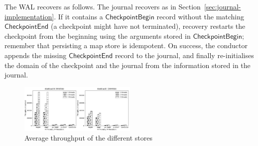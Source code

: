 
The WAL recovers as follows.
The journal recovers as in Section~\ref{sec:journal-implementation}.
If it contains a \ensuremath{\mathsf{CheckpointBegin}} record without
the matching \ensuremath{\mathsf{CheckpointEnd}} (a checkpoint might have not terminated), recovery restarts the checkpoint from the beginning using
the arguments stored in \ensuremath{\mathsf{CheckpointBegin}}; remember
that persisting a map store is idempotent.
On success, the conductor appends the missing
\ensuremath{\mathsf{CheckpointEnd}} record to the journal, and finally
re-initialises the domain of the checkpoint and the journal from the
information stored in the journal.

\begin{figure}[tp]\small\centering
  \centering
  \includegraphics[width=0.5\textwidth]{figures/throughput.png}
  \caption{Average throughput of the different stores}
  \label{fig:throughput}
\end{figure}
